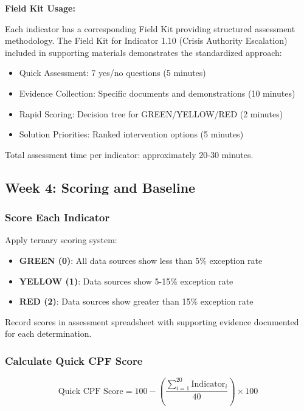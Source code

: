 \documentclass[11pt,a4paper]{article}
\begin{document}
\textbf{Field Kit Usage:}

Each indicator has a corresponding Field Kit providing structured assessment methodology. The Field Kit for Indicator 1.10 (Crisis Authority Escalation) included in supporting materials demonstrates the standardized approach:
\begin{itemize}
\item Quick Assessment: 7 yes/no questions (5 minutes)
\item Evidence Collection: Specific documents and demonstrations (10 minutes)
\item Rapid Scoring: Decision tree for GREEN/YELLOW/RED (2 minutes)
\item Solution Priorities: Ranked intervention options (5 minutes)
\end{itemize}

Total assessment time per indicator: approximately 20-30 minutes.

\subsection{Week 4: Scoring and Baseline}

\subsubsection{Score Each Indicator}

Apply ternary scoring system:
\begin{itemize}
\item \textbf{GREEN (0)}: All data sources show less than 5\% exception rate
\item \textbf{YELLOW (1)}: Data sources show 5-15\% exception rate
\item \textbf{RED (2)}: Data sources show greater than 15\% exception rate
\end{itemize}

Record scores in assessment spreadsheet with supporting evidence documented for each determination.

\subsubsection{Calculate Quick CPF Score}

\begin{equation}
\text{Quick CPF Score} = 100 - \left(\frac{\sum_{i=1}^{20} \text{Indicator}_i}{40}\right) \times 100
\end{equation}
\end{document}
